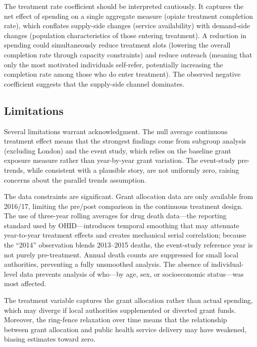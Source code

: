 \documentclass[12pt]{article}
\begin{document}
The treatment rate coefficient should be interpreted cautiously. It captures the net effect of spending on a single aggregate measure (opiate treatment completion rate), which conflates supply-side changes (service availability) with demand-side changes (population characteristics of those entering treatment). A reduction in spending could simultaneously reduce treatment slots (lowering the overall completion rate through capacity constraints) and reduce outreach (meaning that only the most motivated individuals self-refer, potentially increasing the completion rate among those who do enter treatment). The observed negative coefficient suggests that the supply-side channel dominates.

\subsection{Limitations}

Several limitations warrant acknowledgment. The null average continuous treatment effect means that the strongest findings come from subgroup analysis (excluding London) and the event study, which relies on the baseline grant exposure measure rather than year-by-year grant variation. The event-study pre-trends, while consistent with a plausible story, are not uniformly zero, raising concerns about the parallel trends assumption.

The data constraints are significant. Grant allocation data are only available from 2016/17, limiting the pre/post comparison in the continuous treatment design. The use of three-year rolling averages for drug death data---the reporting standard used by OHID---introduces temporal smoothing that may attenuate year-to-year treatment effects and creates mechanical serial correlation; because the ``2014'' observation blends 2013--2015 deaths, the event-study reference year is not purely pre-treatment. Annual death counts are suppressed for small local authorities, preventing a fully unsmoothed analysis. The absence of individual-level data prevents analysis of who---by age, sex, or socioeconomic status---was most affected.

The treatment variable captures the grant allocation rather than actual spending, which may diverge if local authorities supplemented or diverted grant funds. Moreover, the ring-fence relaxation over time means that the relationship between grant allocation and public health service delivery may have weakened, biasing estimates toward zero.
\end{document}
